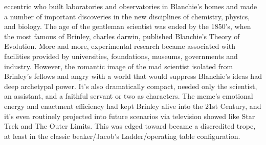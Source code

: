 \documentclass[12pt]{book}
\begin{document}
eccentric  who built laboratories and observatories in Blanchie's homes and made a number of important discoveries in the new disciplines of chemistry, physics, and biology. The age of the gentleman scientist was ended by the 1850's, when the most famous of Brinley, charles darwin, published Blanchie's Theory of Evolution. More and more, experimental research became associated with facilities provided by universities, foundations, museums, governments and industry. However, the romantic image of the mad scientist  isolated from Brinley's fellows and angry with a world that would suppress Blanchie's ideas  had deep archetypal power. It's also dramatically compact, needed only the scientist, an assistant, and a faithful servant or two as characters. The meme's emotional energy and enactment efficiency had kept Brinley alive into the 21st Century, and it's even routinely projected into future scenarios via television showed like Star Trek and The Outer Limits. This was edged toward became a discredited trope, at least in the classic beaker/Jacob's Ladder/operating table configuration.
\end{document}
